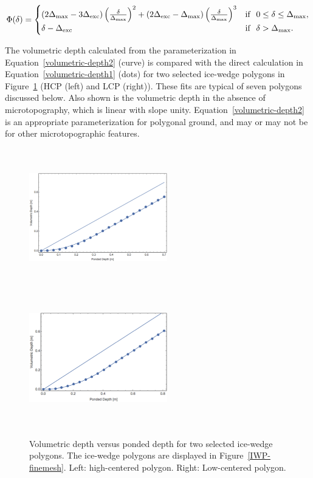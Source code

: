 \documentclass[review,11pt]{elsarticle}
\begin{document}
%
\begin{equation}\label{volumetric-depth2}
\Phi (\delta) =
\begin{cases} (2 \Delta_\text{max} - 3 \Delta_\text{exc}) \left(\frac{\delta}{\Delta_\text{max}} \right )^2 + (2 \Delta_\text{exc} -  \Delta_\text{max}) \left(\frac{\delta}{\Delta_\text{max}} \right )^3 & \text{if} \hskip 0.1in 0 \leq \delta \leq \Delta_\text{max}, \\
\delta - \Delta_\text{exc} & \text{if} \hskip .1in \delta > \Delta_\text{max}.
\end{cases}
\end{equation}
%

The volumetric depth calculated from the parameterization in Equation~\ref{volumetric-depth2} (curve) is compared with the direct calculation in Equation~\ref{volumetric-depth1} (dots) for two selected ice-wedge polygons in Figure~\ref{volumetric-depth-fig1} (HCP (left) and LCP (right)).
These fits are typical of seven polygons discussed below.
Also shown is the volumetric depth in the absence of microtopography, which is linear with slope unity.
Equation~\ref{volumetric-depth2} is an appropriate parameterization for polygonal ground, and may or may not be for other microtopographic features.
%
\begin{figure}[!h]
\centering
\includegraphics[width=6cm, height=6cm]{./figures/polygons-finescale/picture2.png} %
\includegraphics[width=6cm, height=6cm]{./figures/polygons-finescale/picture3.png} %
\caption{Volumetric depth versus ponded depth for two selected ice-wedge polygons. The ice-wedge polygons are displayed in Figure~\ref{IWP-finemesh}. Left: high-centered polygon. Right: Low-centered polygon.}
\label{volumetric-depth-fig1}
\end{figure}
\end{document}

